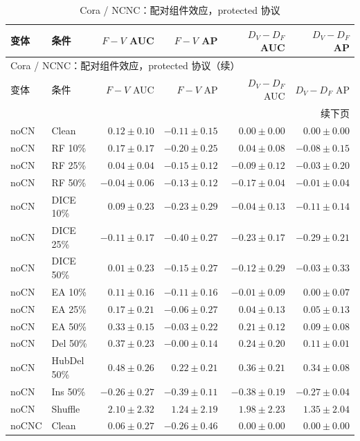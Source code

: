 {\footnotesize
\setlength{\tabcolsep}{3.2pt}
\renewcommand{\arraystretch}{1.10}
\begin{longtable}{llrrrr}
\caption{Cora / NCNC：配对组件效应，protected 协议}\\
\toprule
变体 & 条件 & $F-V$ AUC & $F-V$ AP & $D_V-D_F$ AUC & $D_V-D_F$ AP \\
\midrule
\endfirsthead
\multicolumn{6}{l}{Cora / NCNC：配对组件效应，protected 协议（续）}\\
\toprule
变体 & 条件 & $F-V$ AUC & $F-V$ AP & $D_V-D_F$ AUC & $D_V-D_F$ AP \\
\midrule
\endhead
\midrule\multicolumn{6}{r}{续下页}\\
\endfoot
\bottomrule
\endlastfoot
noCN & Clean & $0.12\pm0.10$ & $-0.11\pm0.15$ & $0.00\pm0.00$ & $0.00\pm0.00$ \\
noCN & RF 10\% & $0.17\pm0.17$ & $-0.20\pm0.25$ & $0.04\pm0.08$ & $-0.08\pm0.15$ \\
noCN & RF 25\% & $0.04\pm0.04$ & $-0.15\pm0.12$ & $-0.09\pm0.12$ & $-0.03\pm0.20$ \\
noCN & RF 50\% & $-0.04\pm0.06$ & $-0.13\pm0.12$ & $-0.17\pm0.04$ & $-0.01\pm0.04$ \\
noCN & DICE 10\% & $0.09\pm0.23$ & $-0.23\pm0.29$ & $-0.04\pm0.13$ & $-0.11\pm0.14$ \\
noCN & DICE 25\% & $-0.11\pm0.17$ & $-0.40\pm0.27$ & $-0.23\pm0.17$ & $-0.29\pm0.21$ \\
noCN & DICE 50\% & $0.01\pm0.23$ & $-0.15\pm0.27$ & $-0.12\pm0.29$ & $-0.03\pm0.33$ \\
noCN & EA 10\% & $0.11\pm0.16$ & $-0.11\pm0.16$ & $-0.01\pm0.09$ & $0.00\pm0.07$ \\
noCN & EA 25\% & $0.17\pm0.21$ & $-0.06\pm0.27$ & $0.04\pm0.13$ & $0.05\pm0.13$ \\
noCN & EA 50\% & $0.33\pm0.15$ & $-0.03\pm0.22$ & $0.21\pm0.12$ & $0.09\pm0.08$ \\
noCN & Del 50\% & $0.37\pm0.23$ & $-0.00\pm0.14$ & $0.24\pm0.20$ & $0.11\pm0.01$ \\
noCN & HubDel 50\% & $0.48\pm0.26$ & $0.22\pm0.21$ & $0.36\pm0.21$ & $0.34\pm0.08$ \\
noCN & Ins 50\% & $-0.26\pm0.27$ & $-0.39\pm0.11$ & $-0.38\pm0.19$ & $-0.27\pm0.04$ \\
noCN & Shuffle & $2.10\pm2.32$ & $1.24\pm2.19$ & $1.98\pm2.23$ & $1.35\pm2.04$ \\
noCNC & Clean & $0.06\pm0.27$ & $-0.26\pm0.46$ & $0.00\pm0.00$ & $0.00\pm0.00$ \\

\end{longtable}}
